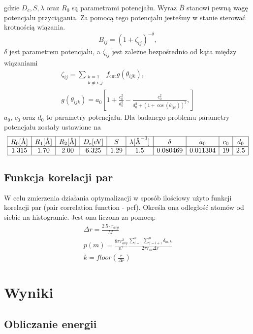 \documentclass[a4paper,12pt]{article}
\begin{document}
	gdzie $D_e, S, \lambda$ oraz $R_0$ są parametrami potencjału.
	Wyraz $\overline{B}$ stanowi pewną wagę potencjału przyciągania. 
	Za pomocą tego potencjału jesteśmy w stanie sterować krotnością wiązania.
	\begin{equation}
		B_{ij} = \left(1 + \zeta_{ij} \right)^{-\delta},
	\end{equation}
	$\delta$ jest parametrem potencjału, a $\zeta_{ij}$ jest zależne bezpośrednio od kąta między wiązaniami
	\begin{gather}
		\zeta_{ij} = \sum_{\substack{k = 1 \\ k \neq i,j}} f_{\text{cut}} g(\theta_{ijk}),\\
		g(\theta_{ijk}) = a_0\left[1 + \frac{c_0^2}{d_0^2} - \frac{c_0^2}{d_0^2 + (1 + \cos(\theta_{ijk}))^2}, \right]
	\end{gather} 
	$a_0$, $c_0$ oraz $d_0$ to parametry potencjału. 
	Dla badanego problemu parametry potencjału zostały ustawione na
\[	
	\begin{array}{|c|c|c|c|c|c|c|c|c|c|}
		\hline
		R_0 [\text{\AA}] & R_1 [\text{\AA}] & R_2 [\text{\AA}] & D_e [\text{eV}] & S & \lambda [\text{\AA}^{-1}] & \delta & a_0 & c_0 & d_0 \\ \hline
		1.315 & 1.70 & 2.00 & 6.325 & 1.29 & 1.5 & 0.080469 & 0.011304 & 19 & 2.5 \\ \hline
	\end{array}
\]	
	\subsection*{Funkcja korelacji par}
	
	W celu zmierzenia działania optymalizacji w sposób ilościowy użyto funkcji korelacji par (pair correlation function - pcf). 
	Określa ona odległość atomów od siebie na histogramie.
	Jest ona liczona za pomocą:
	\begin{gather}
		\Delta r = \frac{2.5 \cdot r_{avg}}{M}\\
		p(m) = \frac{8\pi r_{avg}^2}{n^2} \frac{\sum_{i = 1}^{n} \sum_{j = i+1}^{n} \delta_{m,k}}{2\pi r_m \Delta r} \\ 
		k = floor\left(\frac{r}{\Delta r}\right) 
	\end{gather}
	
	\section*{Wyniki}
	
	\subsection*{Obliczanie energii}
	
\end{document}
